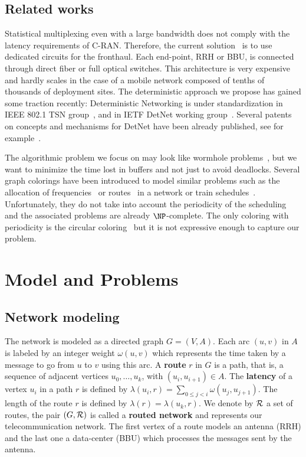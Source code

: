 \documentclass[10pt, conference, letterpaper]{IEEEtran}
\begin{document}
   \subsection*{Related works}
   
 Statistical multiplexing even with a large bandwidth does not comply with the latency requirements of C-RAN. Therefore, the current solution~\cite{pizzinat2015things,tayq2017real} is to use dedicated circuits for the fronthaul. Each end-point, RRH or BBU, is connected through direct fiber or full optical switches. This architecture is very expensive and hardly scales in the case of a mobile network composed of tenths of thousands of deployment sites. The deterministic approach we propose has gained some traction recently: Deterministic Networking is under standardization in IEEE 802.1 TSN group~\cite{finn-detnet-architecture-08}, and in  IETF DetNet working group~\cite{ieee802}. Several patents on concepts and mechanisms for DetNet have been already published, see for example~\cite{howe2005time,leclerc2016transmission}. 
     
The algorithmic problem we focus on may look like wormhole problems~\cite{cole1996benefit}, but  we want to minimize the time lost in buffers and not just to avoid deadlocks. Several graph colorings have been introduced to model similar problems such as the allocation of frequencies~\cite{borndorfer1998frequency}
or routes~\cite{cole1996benefit} in a network or train schedules~\cite{strotmann2007railway}. Unfortunately, they do not take into account the periodicity of the scheduling and the associated problems are already $\NP$-complete. The only coloring with periodicity is the circular coloring~\cite{zhou2013multiple} but it is not expressive enough to capture our problem.

\section{Model and Problems}\label{sec:def}

  \subsection{Network modeling}
  

The network is modeled as a directed graph $G=(V,A)$. Each arc  $(u,v)$ in $A$ is labeled by an integer weight $\omega(u,v)$ which represents the time taken by a message to go from $u$ to $v$ using this arc. A {\bf route} $r$ in $G$ is a path, that is, a sequence of adjacent vertices $u_0, \ldots , u_{k}$, with $(u_i,u_{i+1}) \in A$.  The {\bf latency} of a vertex $u_i$ in a path $r$ is defined by $\lambda(u_i,r)= \sum\limits_{0 \leq j <i} \omega(u_j, u_{j+1})$.
The length of the route $r$ is defined by $\lambda (r)= \lambda (u_k,r)$.
We denote by $\cal R$ a set of routes, the pair $(G,\cal R)$ is called a {\bf routed network} and represents our telecommunication network. The first vertex of a route models an antenna (RRH) and the last one a data-center (BBU) which processes the messages sent by the antenna.
\end{document}
